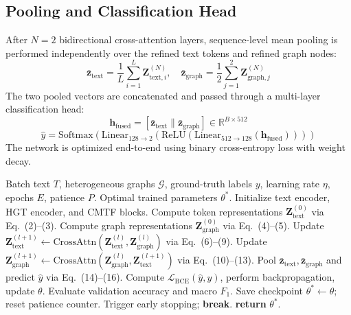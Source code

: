 \documentclass[conference]{IEEEtran}
\begin{document}
\subsection{Pooling and Classification Head}
After $N=2$ bidirectional cross-attention layers, sequence-level mean pooling is performed independently over the refined text tokens and refined graph nodes:
\begin{equation}
\mathbf{\bar{z}}_{\text{text}} = \frac{1}{L} \sum_{i=1}^L \mathbf{Z}_{\text{text}, i}^{(N)}, \quad \mathbf{\bar{z}}_{\text{graph}} = \frac{1}{2} \sum_{j=1}^2 \mathbf{Z}_{\text{graph}, j}^{(N)}
\end{equation}
The two pooled vectors are concatenated and passed through a multi-layer classification head:
\begin{equation}
\mathbf{h}_{\text{fused}} = [\mathbf{\bar{z}}_{\text{text}} \parallel \mathbf{\bar{z}}_{\text{graph}}] \in \mathbb{R}^{B \times 512}
\end{equation}
\begin{equation}
\hat{y} = \text{Softmax}\left(\text{Linear}_{128 \to 2}\left(\text{ReLU}\left(\text{Linear}_{512 \to 128}(\mathbf{h}_{\text{fused}})\right)\right)\right)
\end{equation}
The network is optimized end-to-end using binary cross-entropy loss with weight decay.

\begin{algorithm}[t]
\caption{CMTF Training and Inference Protocol}
\label{alg:cmtf}
\begin{algorithmic}[1]
\REQUIRE Batch text $T$, heterogeneous graphs $\mathcal{G}$, ground-truth labels $y$, learning rate $\eta$, epochs $E$, patience $P$.
\ENSURE Optimal trained parameters $\theta^*$.
\STATE Initialize text encoder, HGT encoder, and CMTF blocks.
        \STATE Compute token representations $\mathbf{Z}_{\text{text}}^{(0)}$ via Eq.~(2)--(3).
        \STATE Compute graph representations $\mathbf{Z}_{\text{graph}}^{(0)}$ via Eq.~(4)--(5).
            \STATE Update $\mathbf{Z}_{\text{text}}^{(l+1)} \leftarrow \text{CrossAttn}(\mathbf{Z}_{\text{text}}^{(l)}, \mathbf{Z}_{\text{graph}}^{(l)})$ via Eq.~(6)--(9).
            \STATE Update $\mathbf{Z}_{\text{graph}}^{(l+1)} \leftarrow \text{CrossAttn}(\mathbf{Z}_{\text{graph}}^{(l)}, \mathbf{Z}_{\text{text}}^{(l+1)})$ via Eq.~(10)--(13).
        \ENDFOR
        \STATE Pool $\mathbf{\bar{z}}_{\text{text}}, \mathbf{\bar{z}}_{\text{graph}}$ and predict $\hat{y}$ via Eq.~(14)--(16).
        \STATE Compute $\mathcal{L}_{\text{BCE}}(\hat{y}, y)$, perform backpropagation, update $\theta$.
    \ENDFOR
    \STATE Evaluate validation accuracy and macro $F_1$.
        \STATE Save checkpoint $\theta^* \leftarrow \theta$; reset patience counter.
        \STATE Trigger early stopping; \textbf{break}.
    \ENDIF
\ENDFOR
\STATE \textbf{return} $\theta^*$.
\end{algorithmic}
\end{algorithm}
\end{document}

